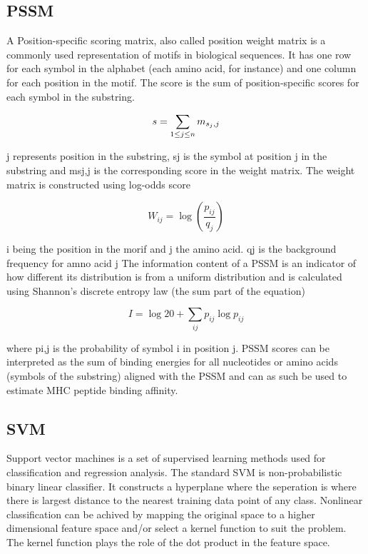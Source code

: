 
\subsection*{PSSM}
A Position-specific scoring matrix, also called position weight matrix is a commonly used representation of motifs in biological sequences. It has one row for each symbol in the alphabet (each amino acid, for instance) and one column for each position in the motif. The score is the sum of position-specific scores for each symbol in the substring.

\begin{equation}
s = \sum_{1\leq j\leq n}{m_{s_j,j}} \\
\end{equation}

j represents position in the substring, sj is the symbol at position j in the substring and msj,j is the corresponding score in the weight matrix. The weight matrix is constructed using log-odds score

\begin{equation}
W_{ij} = \log{ (\frac{p_{ij}}{q_j}) }
\end{equation}

i being the position in the morif and j the amino acid. qj is the background frequency for amno acid j
The information content of a PSSM is an indicator of how different its distribution is from a uniform distribution and is calculated using Shannon's discrete entropy law (the sum part of the equation)

\begin{equation}
I = \log{ 20 } + \sum_{ij}{ p_{ij}\log{p_{ij}} }
\end{equation}

where pi,j is the probability of symbol i in position j.
PSSM scores can be interpreted as the sum of binding energies for all nucleotides or amino acids (symbols of the substring) aligned with the PSSM and can as such be used to estimate MHC peptide binding affinity.

\subsection*{SVM}
Support vector machines is a set of supervised learning methods used for classification and regression analysis. 
The standard SVM is non-probabilistic binary linear classifier. 
It constructs a hyperplane where the seperation is where there is largest distance to the nearest training data point of any class. 
Nonlinear classification can be achived by  mapping the original space to a higher dimensional feature space and/or select a kernel function to suit the problem. 
The kernel function plays the role of the dot product in the feature space.

